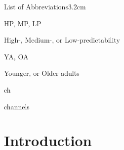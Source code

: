 \documentclass[a4paper, nobind]{templates/ociamthesis}
\begin{document}
\begin{romanpages}
  \dominitoc %

\flushbottom

\tableofcontents

\listoffigures
	\mtcaddchapter

\listoftables
  \mtcaddchapter
\begin{mclistof}{List of Abbreviations}{3.2cm}

\item[HP, MP, LP]

High-, Medium-, or Low-predictability

\item[YA, OA]

Younger, or Older adults

\item[ch]

channels

\end{mclistof} 


\end{romanpages}

\flushbottom

\hypertarget{introduction}{%
\chapter{Introduction}\label{introduction}}
\end{document}
